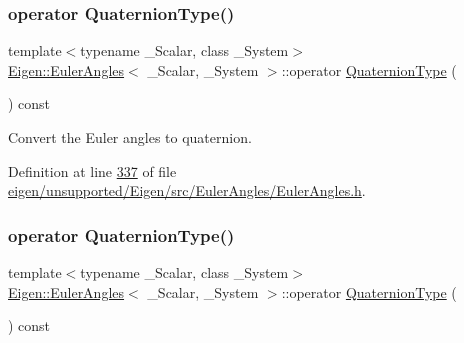 \subsubsection{\texorpdfstring{operator Quaternion\+Type()}{operator QuaternionType()}\hspace{0.1cm}{\footnotesize\ttfamily [1/2]}}
{\footnotesize\ttfamily template$<$typename \+\_\+\+Scalar, class \+\_\+\+System$>$ \\
\hyperlink{class_eigen_1_1_euler_angles}{Eigen\+::\+Euler\+Angles}$<$ \+\_\+\+Scalar, \+\_\+\+System $>$\+::operator \hyperlink{class_eigen_1_1_euler_angles_adf351608cad15e660279f7323e516d3a}{Quaternion\+Type} (\begin{DoxyParamCaption}{ }\end{DoxyParamCaption}) const\hspace{0.3cm}{\ttfamily [inline]}}

Convert the Euler angles to quaternion. 

Definition at line \hyperlink{eigen_2unsupported_2_eigen_2src_2_euler_angles_2_euler_angles_8h_source_l00337}{337} of file \hyperlink{eigen_2unsupported_2_eigen_2src_2_euler_angles_2_euler_angles_8h_source}{eigen/unsupported/\+Eigen/src/\+Euler\+Angles/\+Euler\+Angles.\+h}.

\mbox{\label{class_eigen_1_1_euler_angles_aa4ccd4b412c3146a9dd58a884eaea42e}} 
\subsubsection{\texorpdfstring{operator Quaternion\+Type()}{operator QuaternionType()}\hspace{0.1cm}{\footnotesize\ttfamily [2/2]}}
{\footnotesize\ttfamily template$<$typename \+\_\+\+Scalar, class \+\_\+\+System$>$ \\
\hyperlink{class_eigen_1_1_euler_angles}{Eigen\+::\+Euler\+Angles}$<$ \+\_\+\+Scalar, \+\_\+\+System $>$\+::operator \hyperlink{class_eigen_1_1_euler_angles_adf351608cad15e660279f7323e516d3a}{Quaternion\+Type} (\begin{DoxyParamCaption}{ }\end{DoxyParamCaption}) const\hspace{0.3cm}{\ttfamily [inline]}}


